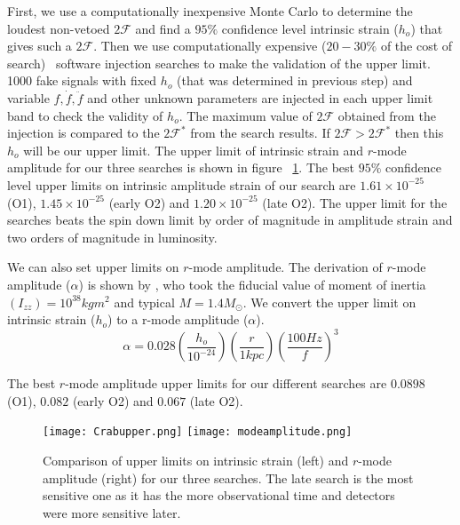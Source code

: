 \documentclass{ttuthes2007}
\begin{document}
First, we use a computationally inexpensive Monte Carlo to determine the loudest
non-vetoed $2\mathcal{F}$ and find a $95\%$ confidence level intrinsic strain
($h_o$) that gives such a $2\mathcal{F}$. Then we use computationally expensive
($20- 30\%$ of the cost of search)~\cite{Aasi_2015} software injection searches
to make the validation of the upper limit. 1000 fake signals with fixed $h_o$
(that was determined in previous step) and variable $f,\dot{f},\ddot{f}$ and
other unknown parameters are injected in each upper limit band to check the
validity of $h_o$. The maximum value of $2\mathcal{F}$ obtained from the
injection is compared to the $2\mathcal{F}^*$ from the search results. If
$2\mathcal{F}> 2\mathcal{F}^*$ then this $h_o$ will be our upper limit.  The
upper limit of intrinsic strain and $r$-mode amplitude for our three searches is
shown in figure ~\ref{fig:UL}.  The best $95\%$ confidence level upper limits on
intrinsic amplitude strain of our search are $1.61\times 10^{-25}$ (O1),
$1.45\times 10^{-25}$ (early O2) and $1.20\times 10^{-25}$ (late O2). The upper
limit for the searches beats the spin down limit by order of magnitude in
amplitude strain and two orders of magnitude in luminosity. 

We can also set upper limits on $r$-mode amplitude.  
The derivation of $r$-mode amplitude ($\alpha$) is shown by \citet{Owen_2010},
who took the fiducial value of moment of inertia $(I_{zz})=10^{38}kgm^2$
and typical $M=1.4M_\odot$. We convert the upper limit on
intrinsic strain ($h_o$) to a r-mode amplitude ($\alpha$).   
\begin{equation} 
\alpha
=0.028\left(\frac{h_o}{10^{-24}}\right)\left(\frac{r}{1kpc}\right)\left(\frac{100Hz}{f}\right)^3
\end{equation} 

The best $r$-mode amplitude upper limits for our different searches are $0.0898$
(O1), $0.082$ (early O2) and $0.067$ (late O2). 


\begin{figure}[h!] 
\texttt{[image: Crabupper.png]}
\texttt{[image: modeamplitude.png]}

\caption{Comparison of upper limits on intrinsic strain (left) and $r$-mode
amplitude (right) for our three searches. The late search is the most sensitive one as it has the more observational
time and detectors were more sensitive later.} 
\label{fig:UL}
\end{figure}
\end{document}
